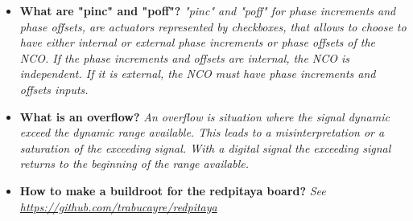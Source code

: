 \documentclass[12pt,oneside]{article}
\begin{document}
\begin{itemize}
	\setlength\itemsep{-0.0cm}
	\item \textbf{What are "pinc" and "poff"?} \newline  \textit{"pinc" and "poff" for phase increments and phase offsets, are actuators represented by checkboxes, that allows to choose to have either internal or external phase increments or phase offsets of the NCO. If the phase increments and offsets are internal, the NCO is independent. If it is external, the NCO must have phase increments and offsets inputs.}
	
	\item \textbf{What is an overflow?} \newline  \textit{An overflow is situation where the signal dynamic exceed the dynamic range available. This leads to a misinterpretation or a saturation of the exceeding signal. With a digital signal the exceeding signal returns to the beginning of the range available.}
	
	\item \textbf{How to make a buildroot for the redpitaya board?} \newline  \textit{See \href{https://github.com/trabucayre/redpitaya}{https://github.com/trabucayre/redpitaya}}
\end{itemize}
\end{document}
